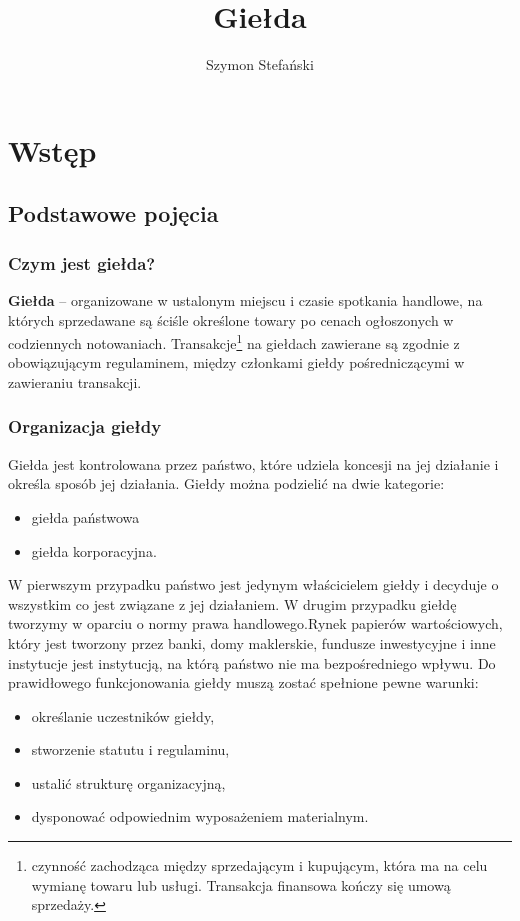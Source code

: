 \documentclass{report}
\title{Giełda}
\author{Szymon Stefański}
\begin{document}
\maketitle
\tableofcontents
\newpage
\chapter{Wstęp}
\section{Podstawowe pojęcia}
\subsection{Czym jest giełda?}
\textbf{Giełda}\cite{pa} – organizowane w ustalonym miejscu i czasie spotkania handlowe, na których sprzedawane są ściśle określone towary po cenach ogłoszonych w codziennych notowaniach. Transakcje\footnote{ czynność zachodząca między sprzedającym i kupującym, która ma na celu wymianę towaru lub usługi. Transakcja finansowa kończy się umową sprzedaży. } na giełdach zawierane są zgodnie z obowiązującym regulaminem, między członkami giełdy pośredniczącymi w zawieraniu transakcji.
\subsection{Organizacja giełdy}
Giełda jest kontrolowana przez państwo, które udziela koncesji na jej działanie i określa sposób jej działania.
Giełdy można podzielić na dwie kategorie:
\begin{itemize}
\item giełda państwowa
\item giełda korporacyjna.
\end{itemize}
W pierwszym przypadku państwo jest jedynym właścicielem giełdy i decyduje o wszystkim co jest związane z jej działaniem. W drugim przypadku giełdę tworzymy w oparciu o normy prawa handlowego.Rynek papierów wartościowych, który jest tworzony przez banki, domy maklerskie, fundusze inwestycyjne i inne instytucje jest instytucją, na którą państwo nie ma bezpośredniego wpływu.
\newline Do prawidłowego funkcjonowania giełdy muszą zostać spełnione pewne warunki:
\begin{itemize}
\item określanie uczestników giełdy,
\item stworzenie statutu i regulaminu,
\item ustalić strukturę organizacyjną,
\item dysponować odpowiednim wyposażeniem materialnym.
\end{itemize}
\end{document}
